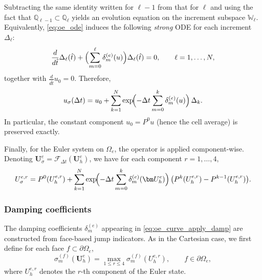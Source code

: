 \documentclass[fleqn,11pt]{amsart}
\begin{document}
Subtracting the same identity written for $\ell-1$ from that for $\ell$
and using the fact that $\mathbb Q_{\ell-1}\subset\mathbb Q_\ell$
yields an evolution equation on the increment subspace
$\mathbb W_\ell$. Equivalently, \eqref{eq:oe_ode} induces the
following \emph{strong} ODE for each increment $\Delta_\ell$:
\begin{equation}
\label{eq:oe_delta_ode}
\frac{d}{d\hat t}\Delta_\ell(\hat t)
+
\Bigl(\sum_{m=0}^{\ell}\delta_m^{(e)}(u)\Bigr)
\Delta_\ell(\hat t)=0,
\qquad \ell=1,\dots,N,
\end{equation}
together with $\frac{d}{d\hat t}u_0=0$.
Therefore,
\begin{equation}
\label{eq:oe_curve_solution}
u_\sigma(\Delta t)
=
u_0
+
\sum_{k=1}^N
\exp\!\Bigl(
-\Delta t\sum_{m=0}^{k}\delta_m^{(e)}(u)
\Bigr)\,
\Delta_k.
\end{equation}
In particular, the constant component $u_0=P^0u$ (hence the cell
average) is preserved exactly.

Finally, for the Euler system on $\Omega_e$, the operator is applied
component-wise. Denoting $\bm U_\sigma^e=\mathcal F_{\Delta t}(\bm U_h^e)$,
we have for each component $r=1,\dots,4$,
\begin{equation}
\label{eq:oe_curve_apply_damp}
U_{\sigma}^{e,r}
=
P^0(U_h^{e,r})
+
\sum_{k=1}^N
\exp\!\Bigl(
-\Delta t\sum_{m=0}^{k}\delta_m^{(e)}(\bm U_h^e)
\Bigr)\,
\bigl(P^k(U_h^{e,r})-P^{k-1}(U_h^{e,r})\bigr).
\end{equation}

\subsubsection{Damping coefficients}

The damping coefficients $\delta_m^{(e)}$ appearing in
\eqref{eq:oe_curve_apply_damp} are constructed from face-based jump
indicators. As in the Cartesian case, we first define for each face
$f\subset\partial\Omega_e$,
\begin{equation}
\label{eq:oe_sigma_face_curve}
\sigma_m^{(f)}(\bm U_h^e)
=
\max_{1\le r\le 4}\sigma_m^{(f)}(U_h^{e,r}),
\qquad f\in\partial\Omega_e,
\end{equation}
where $U_h^{e,r}$ denotes the $r$-th component of the Euler state.
\end{document}
